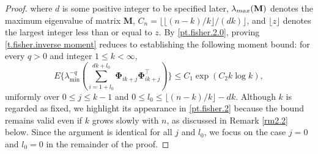 \documentclass[ejsv2]{imsart}
\theoremstyle{plain}
\theoremstyle{definition}
\theoremstyle{remark}
\begin{document}
\begin{proof}
where $d$ is some positive integer to be specified later,
$\lambda_{{\rm max}}(\mathbf{M})$
denotes the maximum eigenvalue of matrix $\mathbf{M}$,
$C_n=\lfloor\lfloor (n-k)/k\rfloor/(dk)\rfloor$, and $\lfloor z\rfloor$ denotes the largest integer less than or equal to $z$. By \eqref{pt.fisher.2.0}, proving \eqref{t.fisher.inverse moment}  reduces to establishing the following moment bound:
for every $q>0$ and integer $1\leq k <\infty$,
\begin{equation}\label{pt.fisher.2}
E\{\lambda_{\min}^{-q}(\sum_{i=1+l_0}^{dk+l_0}\bm{\Phi}_{ik+j}\bm{\Phi}_{ik+j}^\top)\}\leq  C_{1}\exp({C_{2}k\log k}),
\end{equation}
 uniformly over $0\leq j\leq k-1$ and $0\leq l_0\leq\lfloor (n-k)/k\rfloor-dk$.
Although 
$k$ is regarded as fixed,
we highlight its appearance in \eqref{pt.fisher.2} 
because the bound remains valid even if 
$k$ grows slowly with 
$n$, as discussed in Remark \ref{rm2.2} below.
Since the argument is identical for all $j$ and $l_0$, we
focus on the case
$j=0$ and $l_0=0$ in the remainder of the proof. 


\end{proof}
\end{document}
